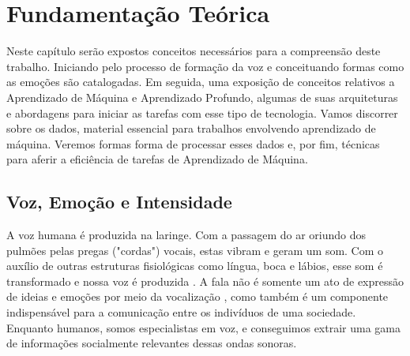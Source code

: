 \chapter{Fundamentação Teórica}\label{Cap:Fundamentação Teórica}

Neste capítulo serão expostos conceitos necessários para a compreensão deste trabalho. Iniciando pelo processo de formação da voz e conceituando formas como as emoções são catalogadas. Em seguida, uma exposição de conceitos relativos a Aprendizado de Máquina e Aprendizado Profundo, algumas de suas arquiteturas e abordagens para iniciar as tarefas com esse tipo de tecnologia. Vamos discorrer sobre os dados, material essencial para trabalhos envolvendo aprendizado de máquina. Veremos formas forma de processar esses dados e, por fim, técnicas para aferir a eficiência de tarefas de Aprendizado de Máquina.\\

\section{Voz, Emoção e Intensidade}

A voz humana é produzida na laringe. Com a passagem do ar oriundo dos pulmões pelas pregas ("cordas") vocais, estas vibram e geram um som. Com o auxílio de outras estruturas fisiológicas como língua, boca e lábios, esse som é transformado e nossa voz é produzida \cite{51}. A fala não é somente um ato de expressão de ideias e emoções por meio da vocalização \cite{6.31}, como também é um componente indispensável para a comunicação entre os indivíduos de uma sociedade. Enquanto humanos, somos especialistas em voz, e conseguimos extrair uma gama de informações socialmente relevantes \cite{49} dessas ondas sonoras.

